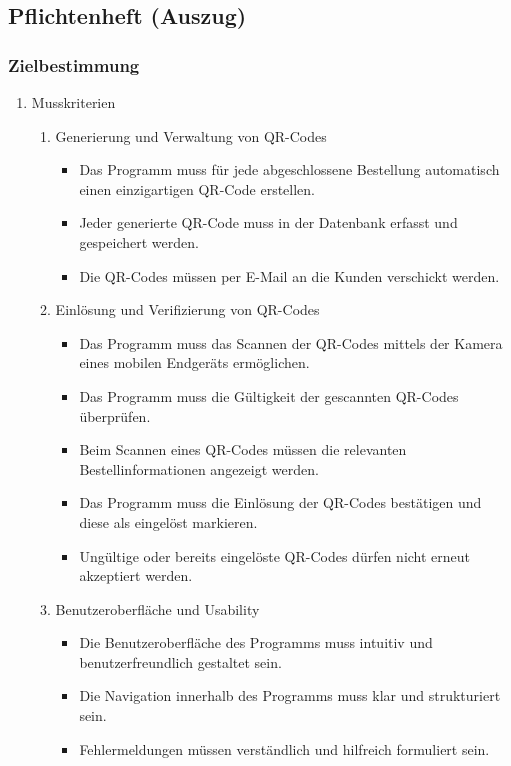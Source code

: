 \subsection{Pflichtenheft (Auszug)}
\label{app:Pflichtenheft}

\subsubsection*{Zielbestimmung}

\begin{enumerate}[itemsep=0em,partopsep=0em,parsep=0em,topsep=0em]
\item Musskriterien
    \begin{enumerate}
        \item Generierung und Verwaltung von QR-Codes
        \begin{itemize}
            \item Das Programm muss für jede abgeschlossene Bestellung automatisch einen einzigartigen QR-Code erstellen.
            \item Jeder generierte QR-Code muss in der Datenbank erfasst und gespeichert werden.
            \item Die QR-Codes müssen per E-Mail an die Kunden verschickt werden.
        \end{itemize}
        
        \item Einlösung und Verifizierung von QR-Codes
        \begin{itemize}
            \item Das Programm muss das Scannen der QR-Codes mittels der Kamera eines mobilen Endgeräts ermöglichen.
            \item Das Programm muss die Gültigkeit der gescannten QR-Codes überprüfen.
            \item Beim Scannen eines QR-Codes müssen die relevanten Bestellinformationen angezeigt werden.
            \item Das Programm muss die Einlösung der QR-Codes bestätigen und diese als eingelöst markieren.
            \item Ungültige oder bereits eingelöste QR-Codes dürfen nicht erneut akzeptiert werden.
        \end{itemize}

        \item Benutzeroberfläche und Usability
        \begin{itemize}
            \item Die Benutzeroberfläche des Programms muss intuitiv und benutzerfreundlich gestaltet sein.
            \item Die Navigation innerhalb des Programms muss klar und strukturiert sein.
            \item Fehlermeldungen müssen verständlich und hilfreich formuliert sein.
        \end{itemize}


\end{enumerate}
\end{enumerate}
